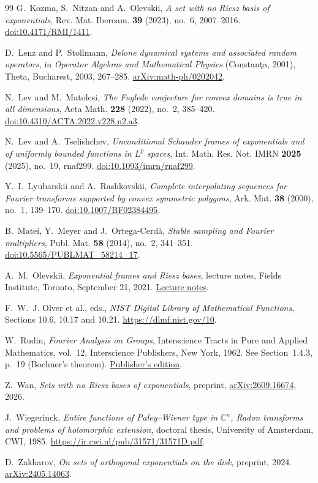 \documentclass[a4paper,12pt,reqno]{amsart}
\theoremstyle{remark}
\numberwithin{equation}{section}
\newcommand{\C}{\mathbb C}
\begin{document}
\begin{thebibliography}{99}
G.~Kozma, S.~Nitzan and A.~Olevskii,
\emph{A set with no Riesz basis of exponentials},
Rev. Mat. Iberoam. \textbf{39} (2023), no.~6, 2007--2016.
\href{https://doi.org/10.4171/RMI/1411}{doi:10.4171/RMI/1411}.

D.~Lenz and P.~Stollmann,
\emph{Delone dynamical systems and associated random operators},
in \emph{Operator Algebras and Mathematical Physics}
(Constan\c{t}a, 2001), Theta, Bucharest, 2003, 267--285.
\href{https://arxiv.org/abs/math-ph/0202042}{arXiv:math-ph/0202042}.

N.~Lev and M.~Matolcsi,
\emph{The Fuglede conjecture for convex domains is true in all dimensions},
Acta Math. \textbf{228} (2022), no.~2, 385--420.
\href{https://doi.org/10.4310/ACTA.2022.v228.n2.a3}{doi:10.4310/ACTA.2022.v228.n2.a3}.

N.~Lev and A.~Tselishchev,
\emph{Unconditional Schauder frames of exponentials and of uniformly bounded
functions in $L^p$ spaces},
Int. Math. Res. Not. IMRN \textbf{2025} (2025), no.~19, rnaf299.
\href{https://doi.org/10.1093/imrn/rnaf299}{doi:10.1093/imrn/rnaf299}.

Y.~I.~Lyubarskii and A.~Rashkovskii,
\emph{Complete interpolating sequences for Fourier transforms supported by
convex symmetric polygons},
Ark. Mat. \textbf{38} (2000), no.~1, 139--170.
\href{https://doi.org/10.1007/BF02384495}{doi:10.1007/BF02384495}.

B.~Matei, Y.~Meyer and J.~Ortega-Cerdà,
\emph{Stable sampling and Fourier multipliers},
Publ. Mat. \textbf{58} (2014), no.~2, 341--351.
\href{https://doi.org/10.5565/PUBLMAT_58214_17}{doi:10.5565/PUBLMAT\_58214\_17}.

A.~M.~Olevskii,
\emph{Exponential frames and Riesz bases},
lecture notes, Fields Institute, Toronto, September 21, 2021.
\href{https://www.fields.utoronto.ca/talk-media/1/38/91/slides.pdf}{Lecture notes}.

F.~W.~J. Olver et al., eds.,
\emph{NIST Digital Library of Mathematical Functions},
Sections 10.6, 10.17 and 10.21.
\url{https://dlmf.nist.gov/10}.

W.~Rudin,
\emph{Fourier Analysis on Groups},
Interscience Tracts in Pure and Applied Mathematics, vol.~12,
Interscience Publishers, New York, 1962.
See Section~1.4.3, p.~19 (Bochner's theorem).
\href{https://doi.org/10.1002/9781118165621}{Publisher's edition}.

Z.~Wan,
\emph{Sets with no Riesz bases of exponentials},
preprint, \href{https://arxiv.org/abs/2609.16674}{arXiv:2609.16674}, 2026.

J.~Wiegerinck,
\emph{Entire functions of Paley--Wiener type in $\C^n$, Radon transforms
and problems of holomorphic extension},
doctoral thesis, University of Amsterdam, CWI, 1985.
\url{https://ir.cwi.nl/pub/31571/31571D.pdf}.

D.~Zakharov,
\emph{On sets of orthogonal exponentials on the disk},
preprint, 2024.
\href{https://arxiv.org/abs/2405.14063}{arXiv:2405.14063}.
\end{thebibliography}
\end{document}

